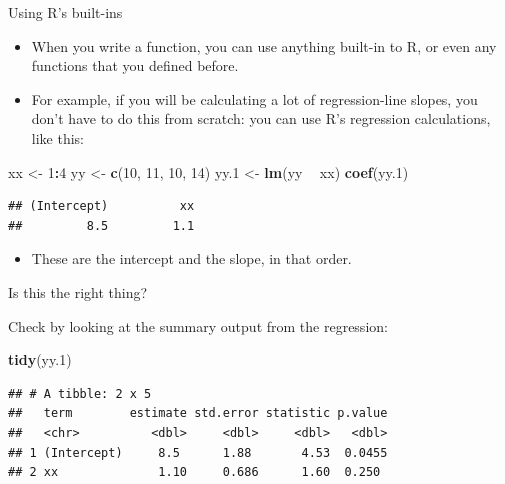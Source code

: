 \documentclass[
  ignorenonframetext,
]{beamer}
\newenvironment{Shaded}{\begin{snugshade}}{\end{snugshade}}
\newcommand{\DecValTok}[1]{\textcolor[rgb]{0.00,0.00,0.81}{#1}}
\newcommand{\FloatTok}[1]{\textcolor[rgb]{0.00,0.00,0.81}{#1}}
\newcommand{\KeywordTok}[1]{\textcolor[rgb]{0.13,0.29,0.53}{\textbf{#1}}}
\newcommand{\NormalTok}[1]{#1}
\newcommand{\OperatorTok}[1]{\textcolor[rgb]{0.81,0.36,0.00}{\textbf{#1}}}
\newcommand{\StringTok}[1]{\textcolor[rgb]{0.31,0.60,0.02}{#1}}
\providecommand{\tightlist}{%
  \setlength{\itemsep}{0pt}\setlength{\parskip}{0pt}}
\begin{document}
\begin{frame}[fragile]{Using R's built-ins}
\protect\hypertarget{using-rs-built-ins}{}

\begin{itemize}
\tightlist
\item
  When you write a function, you can use anything built-in to R, or even
  any functions that you defined before.
\item
  For example, if you will be calculating a lot of regression-line
  slopes, you don't have to do this from scratch: you can use R's
  regression calculations, like this:
\end{itemize}

\begin{Shaded}
\begin{Highlighting}[]
\NormalTok{xx <-}\StringTok{ }\DecValTok{1}\OperatorTok{:}\DecValTok{4}
\NormalTok{yy <-}\StringTok{ }\KeywordTok{c}\NormalTok{(}\DecValTok{10}\NormalTok{, }\DecValTok{11}\NormalTok{, }\DecValTok{10}\NormalTok{, }\DecValTok{14}\NormalTok{)}
\NormalTok{yy}\FloatTok{.1}\NormalTok{ <-}\StringTok{ }\KeywordTok{lm}\NormalTok{(yy }\OperatorTok{~}\StringTok{ }\NormalTok{xx)}
\KeywordTok{coef}\NormalTok{(yy}\FloatTok{.1}\NormalTok{)}
\end{Highlighting}
\end{Shaded}

\begin{verbatim}
## (Intercept)          xx 
##         8.5         1.1
\end{verbatim}

\begin{itemize}
\tightlist
\item
  These are the intercept and the slope, in that order.
\end{itemize}

\end{frame}

\begin{frame}[fragile]{Is this the right thing?}
\protect\hypertarget{is-this-the-right-thing}{}

Check by looking at the summary output from the regression:

\begin{Shaded}
\begin{Highlighting}[]
\KeywordTok{tidy}\NormalTok{(yy}\FloatTok{.1}\NormalTok{)}
\end{Highlighting}
\end{Shaded}

\begin{verbatim}
## # A tibble: 2 x 5
##   term        estimate std.error statistic p.value
##   <chr>          <dbl>     <dbl>     <dbl>   <dbl>
## 1 (Intercept)     8.5      1.88       4.53  0.0455
## 2 xx              1.10     0.686      1.60  0.250
\end{verbatim}

\end{frame}
\end{document}
